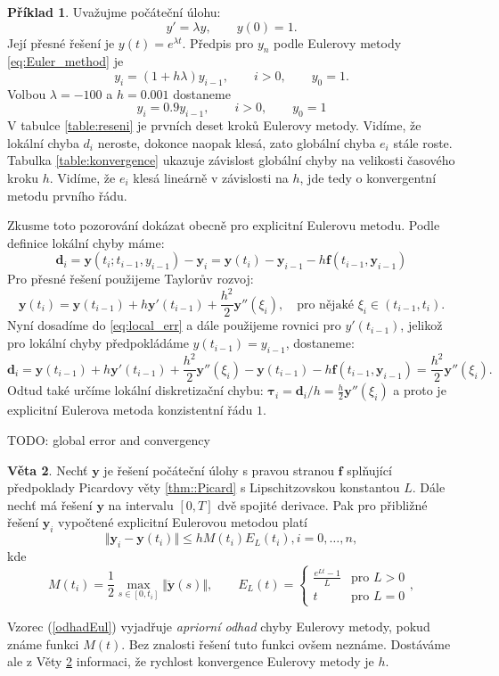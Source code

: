 \documentclass[a4paper, 12pt]{book}
\theoremstyle{definition}
\newtheorem{theorem}{Věta}[section]
\newtheorem{example}[theorem]{Příklad}
\def\vc#1{\mathbf{\boldsymbol{#1}}}     %
\def\norm#1{\bigl\Vert#1\bigr\Vert} %
\begin{document}
\begin{example}
\label{ex:decay}
Uvažujme počáteční úlohu:
\[
  y'=\lambda y,\qquad y(0) =1.
\]
Její přesné řešení je $y(t) = e^{\lambda t}$. Předpis pro $y_n$ podle Eulerovy metody \eqref{eq:Euler_method} je
\[
   y_i = (1+ h\lambda)y_{i-1},\qquad i>0,\qquad y_0=1.
\]
Volbou $\lambda=-100$ a $h=0.001$ dostaneme 
\[
    y_i=0.9y_{i-1}, \qquad i>0,\qquad y_0=1
\]
V tabulce \ref{table:reseni} je prvních deset kroků 
Eulerovy metody. Vidíme, že lokální chyba $d_i$ neroste, dokonce naopak klesá, zato globální chyba $e_i$
stále roste. Tabulka \ref{table:konvergence} ukazuje závislost globální chyby na velikosti časového kroku $h$. 
Vidíme, že $e_i$ klesá lineárně v závislosti na $h$, jde tedy o konvergentní metodu prvního řádu. 


Zkusme toto pozorování dokázat obecně pro explicitní Eulerovu metodu. Podle definice lokální chyby máme:
\begin{equation}
  \label{eq:local_err}
  \vc d_i = \vc y(t_i;t_{i-1}, y_{i-1}) - \vc y_i = \vc y(t_i) - \vc y_{i-1} - h \vc f(t_{i-1}, \vc y_{i-1}) 
\end{equation}
Pro přesné řešení použijeme Taylorův rozvoj:
\[
    \vc y(t_i)=\vc y(t_{i-1})+ h \vc y'(t_{i-1})+\frac{h^2}{2}\vc y''(\xi_i),\quad \text{pro nějaké }\xi_i \in (t_{i-1}, t_i).
\]
Nyní dosadíme do \eqref{eq:local_err} a dále použijeme rovnici pro  $y'(t_{i-1})$, jelikož pro lokální chyby předpokládáme  
$y(t_{i-1})=y_{i-1}$, dostaneme:
\[
    \vc d_i = \vc y(t_{i-1})+h\vc y '(t_{i-1}) + \frac{h^2}{2}\vc y''(\xi_i) - \vc y(t_{i-1}) - h\vc f(t_{i-1}, \vc y_{i-1}) = \frac{h^2}{2}\vc y''(\xi_i).
\]
Odtud také určíme lokální diskretizační chybu: $\vc \tau_i = \vc d_i/h = \frac{h}{2}\vc y''(\xi_i)$ a proto je explicitní 
Eulerova metoda konzistentní řádu $1$.

TODO: global error and convergency
\end{example}

\begin{theorem}\label{Veta2.2}
Nechť $\vc y$ je řešení počáteční úlohy s pravou stranou  $\vc f$ splňující předpoklady Picardovy věty \ref{thm::Picard} s Lipschitzovskou konstantou $L$.
Dále nechť má řešení $\vc y$ na intervalu $[ 0, T]$ dvě spojité derivace. Pak pro přibližné řešení  $\vc y_i$ vypočtené explicitní Eulerovou metodou platí
\begin{equation}\label{odhadEul}
\norm{\vc y_i - \vc y(t_i)} \leq h M(t_i) E_L(t_i), i=0,\dots,n,
\end{equation}
kde 
\begin{displaymath}
M(t_i) = \frac 12 \max_{s\in [0,t_i]} \norm{\ddot{\vc{y}}(s)},\qquad
E_L(t)=\left\{\begin{array}{ll}
                \frac{e^{Lt}-1}{L}&\mbox{pro } L>0\\
                t&\mbox{pro } L=0
              \end{array}\right. ,
\end{displaymath}
\end{theorem}
Vzorec (\ref{odhadEul}) vyjadřuje {\em apriorní odhad} chyby Eulerovy metody, 
pokud známe funkci $M(t)$. Bez znalosti řešení tuto funkci ovšem neznáme. 
Dostáváme ale z Věty \ref{Veta2.2} informaci, že rychlost konvergence Eulerovy 
metody je $h$. 
\end{document}
